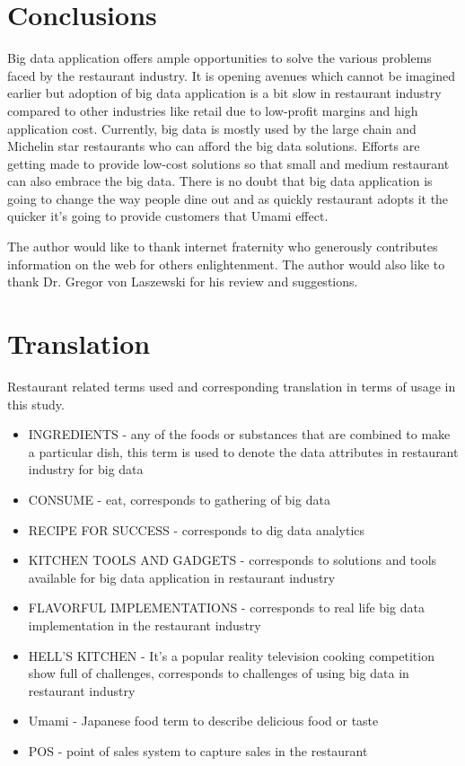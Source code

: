 \documentclass[sigconf]{acmart}
\begin{document}
\section{Conclusions}

Big data application offers ample opportunities to solve the various problems faced by the restaurant industry. It is opening avenues which cannot be imagined earlier but adoption of big data application is a bit slow in restaurant industry compared to other industries like retail due to low-profit margins and high application cost. Currently, big data is mostly used by the large chain and Michelin star restaurants who can afford the big data solutions. Efforts are getting made to provide low-cost solutions so that small and medium restaurant can also embrace the big data. There is no doubt that big data application is going to change the way people dine out and as quickly restaurant adopts it the quicker it's going to provide customers that Umami effect.

\begin{acks}
  The author would like to thank internet fraternity who generously contributes information on the web for others enlightenment.  The author would also like to thank Dr. Gregor von Laszewski for his review and suggestions.
\end{acks}



 

\appendix

\section{Translation}
Restaurant related terms used and corresponding translation in terms of usage in this study.
\begin{itemize}
  \item INGREDIENTS - any of the foods or substances that are combined to make a particular dish, this term is used to denote the data attributes in restaurant industry for big data
  \item CONSUME - eat, corresponds to gathering of big data
  \item RECIPE FOR SUCCESS - corresponds to dig data analytics
  \item KITCHEN TOOLS AND GADGETS  - corresponds to solutions and tools available for big data application in restaurant industry
  \item FLAVORFUL IMPLEMENTATIONS - corresponds to real life big data implementation in the restaurant industry
 \item HELL'S KITCHEN - It's a popular reality television cooking competition show full of challenges, corresponds to challenges of using big data in restaurant industry
 \item Umami - Japanese food term to describe delicious food or taste
 \item POS - point of sales system to capture sales in the restaurant
\end{itemize}


\end{document}
